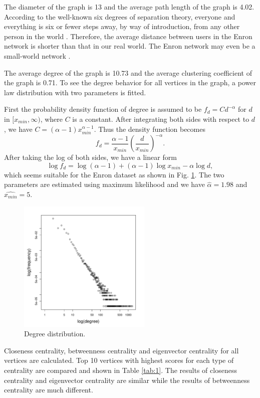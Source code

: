 \documentclass[journal]{IEEEtran}
\begin{document}
The diameter of the graph is 13 and the average path length of the graph is 4.02. According to the well-known six degrees of separation theory, everyone and everything is six or fewer steps away, by way of introduction, from any other person in the world \cite{Barabasi:2003aa}. Therefore, the average distance between users in the Enron network is shorter than that in our real world. The Enron network may even be a small-world network \cite{D.-J.-Watts:1998aa}. 

The average degree of the graph is 10.73 and the average clustering coefficient of the graph is 0.71. To see the degree behavior for all vertices in the graph, a power law distribution with two parameters is fitted. 

First the probability density function of degree is assumed to be $f_{d} = C  d^{- \alpha}$ for $d$ in $[x_{min}, \infty)$, where $C$ is a constant. After integrating both sides with respect to $d$, we have $C = (\alpha - 1) x_{min}^{\alpha - 1}$. Thus the density function becomes 
$$f_{d} =  \frac{\alpha - 1}{x_{min}} \left( \frac{d}{x_{min}} \right)^{- \alpha}.$$
After taking the log of both sides, we have a linear form 
$$\log f_{d} = \log(\alpha - 1) + (\alpha - 1) \log x_{min} - \alpha \log d,$$
which seems suitable for the Enron dataset as shown in Fig. \ref{fig:2}. The two parameters are estimated using maximum likelihood and we have $\hat{\alpha} = 1.98$ and $\widehat{x_{min}} = 5$.

\begin{figure}[!t]
\centering
\includegraphics[width=2.5in]{../Images/degree_distribution.pdf}
\caption{Degree distribution.}
\label{fig:2}
\end{figure}

Closeness centrality, betweenness centrality and eigenvector centrality for all vertices are calculated. Top 10 vertices with highest scores for each type of centrality are compared and shown in Table \ref{tab:1}. The results of closeness centrality and eigenvector centrality are similar while the results of betweenness centrality are much different. 
\end{document}
